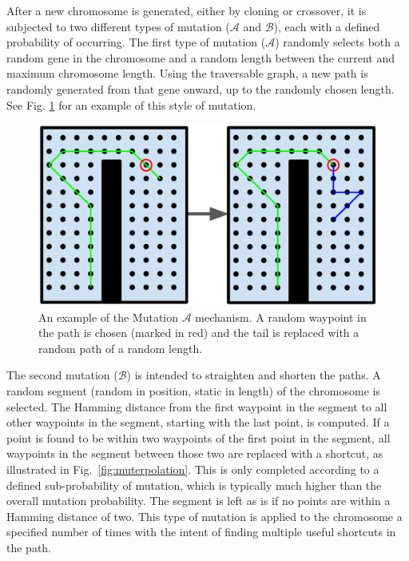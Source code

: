 \documentclass[letterpaper, 10 pt, conference]{ieeeconf}  %
\begin{document}
After a new chromosome is generated, either by cloning or crossover, it is subjected to two different types of mutation ($\mathcal{A}$ and $\mathcal{B}$), each with a defined probability of occurring. The first type of mutation ($\mathcal{A}$) randomly selects both a random gene in the chromosome and a random length between the current and maximum chromosome length. Using the traversable graph, a new path is randomly generated from that gene onward, up to the randomly chosen length. See Fig. \ref{fig:mutation} for an example of this style of mutation.

\begin{figure}
\centering
\includegraphics[width=1.0\linewidth]{mutation.png}
\caption[An example of the coverage planner Mutation $\mathcal{A}$ mechanism]{An example of the Mutation $\mathcal{A}$ mechanism. A random waypoint in the path is chosen (marked in red) and the tail is replaced with a random path of a random length.}
\label{fig:mutation}
\end{figure}

The second mutation ($\mathcal{B}$) is intended to straighten and shorten the paths. A random segment (random in position, static in length) of the chromosome is selected. The Hamming distance from the first waypoint in the segment to all other waypoints in the segment, starting with the last point, is computed. If a point is found to be within two waypoints of the first point in the segment, all waypoints in the segment between those two are replaced with a shortcut, as illustrated in Fig.~\ref{fig:muterpolation}. This is only completed according to a defined sub-probability of mutation, which is typically much higher than the overall mutation probability. The segment is left as is if no points are within a Hamming distance of two. This type of mutation is applied to the chromosome a specified number of times with the intent of finding multiple useful shortcuts in the path.
\end{document}
